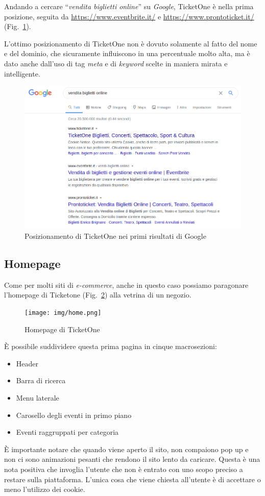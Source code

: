 	Andando a cercare ``\textit{vendita biglietti online}'' su \textit{Google}, TicketOne è nella prima posizione, seguita da \url{https://www.eventbrite.it/} e \url{https://www.prontoticket.it/} (Fig.~\ref{posizionamento}).
	\par L'ottimo posizionamento di TicketOne non è dovuto solamente al fatto del nome e del dominio, che sicuramente influiscono in una percentuale molto alta, ma è dato anche dall'uso di tag \textit{meta} e di \textit{keyword} scelte in maniera mirata e intelligente.
	\begin{figure}[hbt]
		\centering
		\includegraphics[width=\textwidth]{img/posizionamento.png}
		\caption{Posizionamento di TicketOne nei primi risultati di Google}
		\label{posizionamento}
	\end{figure}

\subsection{Homepage}
	
	Come per molti siti di \textit{e-commerce}, anche in questo caso possiamo paragonare l'homepage di Ticketone (Fig.~\ref{homepage}) alla vetrina di un negozio.
	\begin{figure}[hbt]
	    \centering
	    \texttt{[image: img/home.png]}
	    \caption{Homepage di TicketOne}
	    \label{homepage}
	\end{figure}
	\par \`E possibile suddividere questa prima pagina in cinque macrosezioni:
	\begin{itemize}[noitemsep]
		\item Header
		\item Barra di ricerca 
		\item Menu laterale
		\item Carosello degli eventi in primo piano
		\item Eventi raggruppati per categoria
	\end{itemize}
	\`E importante notare che quando viene aperto il sito, non compaiono pop up e non ci sono animazioni pesanti che rendono il sito lento da caricare.
	Questa è una nota positiva che invoglia l'utente che non è entrato con uno scopo preciso a restare sulla piattaforma.
	L'unica cosa che viene chiesta all'utente è di accettare o meno l'utilizzo dei cookie.

